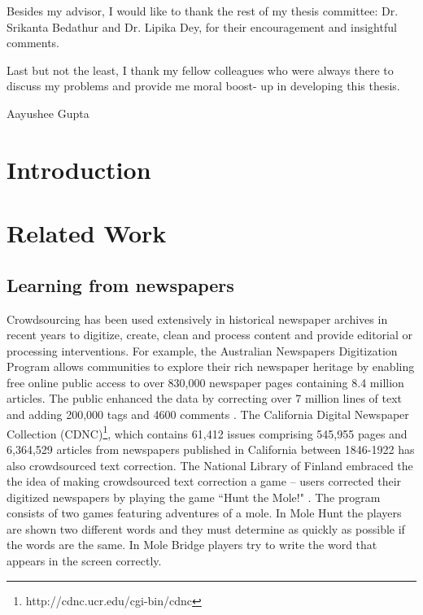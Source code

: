 \documentclass[letterpaper,11pt]{report}
\begin{document}
Besides my advisor, I would like to thank the rest of my thesis committee: Dr. Srikanta Bedathur and Dr. Lipika Dey, for their encouragement and insightful comments.

Last but not the least, I thank my fellow colleagues who were always there to discuss my problems and provide me moral boost- up in developing this thesis.\\ \vspace{0.2in}

Aayushee Gupta

\newpage

\tableofcontents
\listoffigures 
\listoftables

\newpage

\newpage

\newpage
\mbox{}



\chapter{Introduction}\label{chapter:introduction}
\setcounter{page}{1}
\onehalfspacing
 

\chapter{Related Work}


\section{Learning from newspapers}

Crowdsourcing has been used extensively in historical newspaper archives in recent years to 
digitize, create, clean and process content and provide editorial or processing interventions. For example, the Australian Newspapers Digitization Program \cite{ADNP} allows communities to explore their rich newspaper heritage by enabling free online public access to over 830,000 newspaper pages containing 8.4 million articles. The public enhanced the data by correcting over 7 million lines of text and adding 200,000 tags and 4600 comments \cite{holley_09,holley_09a,Holley_10,Holley10a}. The California Digital Newspaper Collection (CDNC)\footnote{http://cdnc.ucr.edu/cgi-bin/cdnc}, which contains 61,412 issues comprising 545,955 pages and 6,364,529 articles from newspapers published in California between 1846-1922 has also crowdsourced text correction. The National Library of Finland embraced the the idea of making crowdsourced text correction a game -- users corrected their digitized newspapers by playing the game ``Hunt the Mole!" \cite{chrons_11}. The program consists of two games featuring adventures of a mole. In Mole Hunt the players are shown two different words and they must determine as quickly as possible if the words are the same. In Mole Bridge players try to write the word that appears in the screen correctly. 
\end{document}
